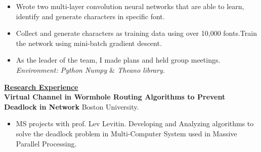 \documentclass{resume} %
\begin{document}
\begin{spacing}{1}
\begin{center}
\begin{itemize}
\item{Wrote two multi-layer convolution neural networks that are able to learn, identify and generate characters in specific font. } \\
\item{Collect and generate characters as training data using over 10,000 fonts.Train the network using mini-batch gradient descent. } \\
\item{As the leader of the team, I made plans and held group meetings. } \\
\hspace{-9mm}\textit{Environment: Python Numpy $\&$ Theano library.}
\vspace{-1mm}
\end{itemize}

\vspace{2mm}
\uline{{\bf{\LARGE Research Experience}}\hfill{\hspace{10cm}{}}} \\
\vspace{1mm}
{\bf Virtual Channel in Wormhole Routing Algorithms to Prevent Deadlock in Network} \hfill {\small Boston University.} \\
\vspace{-0mm}
\begin{itemize}
\item{MS projects with prof. Lev Levitin. Developing and Analyzing algorithms to solve the deadlock problem in Multi-Computer System used in Massive Parallel Processing.  } \\
\end{itemize}
\vspace{-2mm}


\end{center}
\end{spacing}
\end{document}
